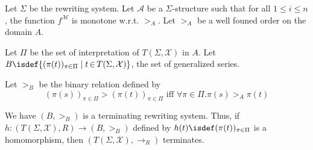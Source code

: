     \begin{definition}
        Let $\Sigma$ be the rewriting system. 
        Let $\mathcal{A}$ be a $\Sigma$-structure such that for all $1 \leq i \leq n$, the function $f^\mathcal{M}$ is monotone w.r.t. $>_A$. Let $>_A$ be a well founed order on the domain $A$.

        Let $\Pi$ be the set of interpretation of $T(\Sigma,\mathcal{X})$ in $A$.
        Let $B\isdef \{(\pi(t))_{\pi\in \Pi} \mid t \mathop{\in} T(\Sigma,\mathcal{X})\}$, the set of generalized series. 

        Let $>_B$ be the binary relation defined by 
        $$(\pi(s))_{\pi\in \Pi} \mathop{>} (\pi(t))_{\pi\in \Pi} \text{ iff } \forall \pi \mathop{\in} \Pi. \pi(s) >_A \pi(t)$$


        We have $(B, >_B)$ is a terminating rewriting system. Thus, if $h:(T(\Sigma,\mathcal{X}),R) \mathop{\to} (B,>_B)$ defined by $h(t) \isdef (\pi(t))_{\pi\in \Pi}$ is a homomorphism, then $(T(\Sigma,\mathcal{X}), \mathop{\to} _R)$ terminates.
    \end{definition}